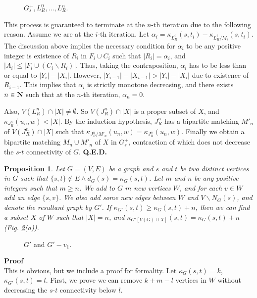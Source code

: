 \documentclass{article}
\newtheorem{proposition}[theorem]{Proposition}
\begin{document}
\begin{figure}\begin{center}
\caption[Fig11]{$G_s^+, L_R^0, \ldots, L_R^n$.}
\label{label_fig11}
\end{center}\end{figure}

This process is guaranteed to terminate at the $n$-th iteration due to the following reason.
Assume we are at the $i$-th iteration. Let $\alpha_i = \kappa_{L_R^i}(s, t_i) - \kappa_{L_R^i/M_i}(s, t_i)$.
The discussion above implies the necessary condition for $\alpha_i$ to be any positive integer
is existence of $R_i$ in $F_i \cup C_i$ such that $|R_i| = \alpha_i$, and $|A_i| \le |F_i \cup (C_i \backslash R_i)|$.
Thus, taking the contraposition, $\alpha_i$ has to be less than or equal to $|Y_i| - |X_i|$.
However, $|Y_{i-1}| - |X_{i-1}| > |Y_{i}| - |X_{i}|$ due to existence of $R_{i-1}$.
This implies that $\alpha_i$ is strictly monotone decreasing,
and there exists $n \in {\bf N}$ such that at the $n$-th iteration,
$\alpha_n = 0$.

Also, $V(L_R^n)\cap |X| \ne \emptyset$.
So $V(J_R^n)\cap |X|$ is a proper subset of $X$, and $\kappa_{J_R^n}(u_n, w) < |X|$.
By the induction hypothesis, $J_R^n$ has a bipartite matching $M'_n$ of $V(J_R^n)\cap |X|$
such that $\kappa_{J_R^n/M'_n}(u_n, w) = \kappa_{J_R^n}(u_n, w)$.
Finally we obtain a bipartite matching $M_n \cup M'_n$ of $X$ in $G_s^+$, contraction of which does not decrease the
$s$-$t$ connectivity of $G$. {\bf Q.E.D.}

\begin{proposition}\label{prop1}
Let $G=(V, E)$ be a graph and $s$ and $t$ be two distinct
vertices in $G$ such that $\{s, t\}\not\in E \wedge d_G(s)=\kappa_G(s, t)$.
Let $m$ and $n$ be any positive integers such that $m \ge n$.
We add to $G$ $m$ new vertices $W$,
and for each $v \in W$ add an edge $\{s, v\}$.
We also add some new edges between $W$ and $V\backslash N_G(s)$,
and denote the resultant graph by $G'$.
If $\kappa_{G'}(s, t)\ge \kappa_G(s, t) + n$, then we can find a subset $X$ of $W$
such that $|X| = n$, and $\kappa_{G'[V(G)\cup X]}(s, t) = \kappa_G(s, t) + n$ (Fig. \ref{label_fig12}(a)).

\end{proposition}
\begin{figure}\begin{center}
\caption[Fig12]{$G'$ and $G'-v_1$.}
\label{label_fig12}
\end{center}\end{figure}
{\bf Proof}\\
This is obvious, but we include a proof for formality.
Let $\kappa_G(s, t) = k$,\\ $\kappa_{G'}(s, t) = l$.
First, we prove we can remove
$k + m - l$ vertices in $W$ without decreasing the $s$-$t$ connectivity below $l$.
\end{document}
